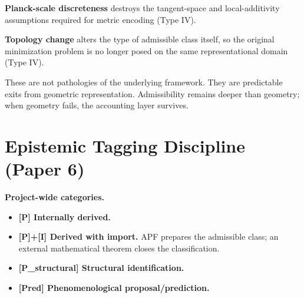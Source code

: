 \documentclass[11pt]{article}
\begin{document}
\textbf{Planck-scale discreteness} destroys the tangent-space and
local-additivity assumptions required for metric encoding (Type IV).

\textbf{Topology change} alters the type of admissible class itself, so the
original minimization problem is no longer posed on the same representational
domain (Type IV).

These are not pathologies of the underlying framework. They are predictable
exits from geometric representation. Admissibility remains deeper than geometry;
when geometry fails, the accounting layer survives.

\section{Epistemic Tagging Discipline (Paper 6)}\label{sec:tagging}

\begin{apfbox}
\textbf{Project-wide categories.}
\begin{itemize}[leftmargin=1.5em,nosep]
    \item \textbf{[P] Internally derived.}
    \item \textbf{[P]+[I] Derived with import.} APF prepares the admissible
    class; an external mathematical theorem closes the classification.
    \item \textbf{[P\_structural] Structural identification.}
    \item \textbf{[Pred] Phenomenological proposal/prediction.}
\end{itemize}
\end{apfbox}
\end{document}
